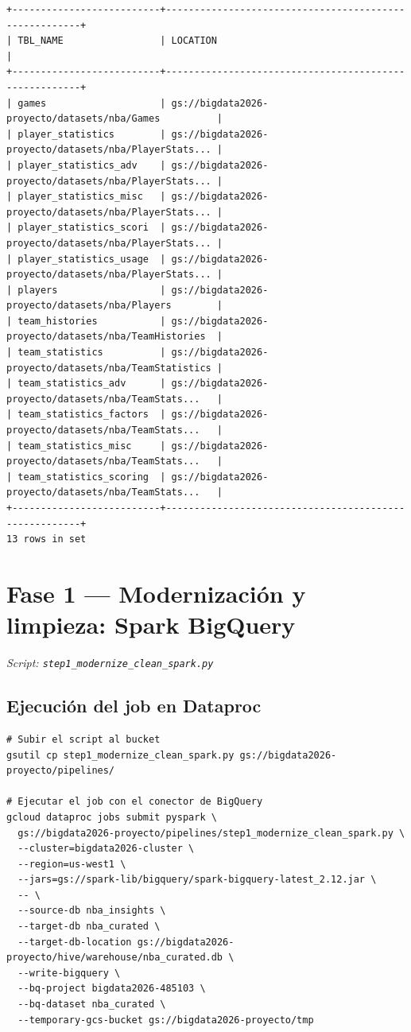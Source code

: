 \documentclass[12pt, letterpaper]{article}
\begin{document}
\begin{lstlisting}[style=outputstyle, caption={Evidencia --- metastore registra las 13 tablas apuntando a GCS}]
+--------------------------+-------------------------------------------------------+
| TBL_NAME                 | LOCATION                                              |
+--------------------------+-------------------------------------------------------+
| games                    | gs://bigdata2026-proyecto/datasets/nba/Games          |
| player_statistics        | gs://bigdata2026-proyecto/datasets/nba/PlayerStats... |
| player_statistics_adv    | gs://bigdata2026-proyecto/datasets/nba/PlayerStats... |
| player_statistics_misc   | gs://bigdata2026-proyecto/datasets/nba/PlayerStats... |
| player_statistics_scori  | gs://bigdata2026-proyecto/datasets/nba/PlayerStats... |
| player_statistics_usage  | gs://bigdata2026-proyecto/datasets/nba/PlayerStats... |
| players                  | gs://bigdata2026-proyecto/datasets/nba/Players        |
| team_histories           | gs://bigdata2026-proyecto/datasets/nba/TeamHistories  |
| team_statistics          | gs://bigdata2026-proyecto/datasets/nba/TeamStatistics |
| team_statistics_adv      | gs://bigdata2026-proyecto/datasets/nba/TeamStats...   |
| team_statistics_factors  | gs://bigdata2026-proyecto/datasets/nba/TeamStats...   |
| team_statistics_misc     | gs://bigdata2026-proyecto/datasets/nba/TeamStats...   |
| team_statistics_scoring  | gs://bigdata2026-proyecto/datasets/nba/TeamStats...   |
+--------------------------+-------------------------------------------------------+
13 rows in set
\end{lstlisting}

\section{Fase 1 — Modernización y limpieza: Spark \textrightarrow{} BigQuery}
\textit{Script: \texttt{step1\_modernize\_clean\_spark.py}}

\subsection{Ejecución del job en Dataproc}

\begin{lstlisting}[style=codestyle, caption={Subida del script y ejecución del job PySpark en Dataproc}]
# Subir el script al bucket
gsutil cp step1_modernize_clean_spark.py gs://bigdata2026-proyecto/pipelines/

# Ejecutar el job con el conector de BigQuery
gcloud dataproc jobs submit pyspark \
  gs://bigdata2026-proyecto/pipelines/step1_modernize_clean_spark.py \
  --cluster=bigdata2026-cluster \
  --region=us-west1 \
  --jars=gs://spark-lib/bigquery/spark-bigquery-latest_2.12.jar \
  -- \
  --source-db nba_insights \
  --target-db nba_curated \
  --target-db-location gs://bigdata2026-proyecto/hive/warehouse/nba_curated.db \
  --write-bigquery \
  --bq-project bigdata2026-485103 \
  --bq-dataset nba_curated \
  --temporary-gcs-bucket gs://bigdata2026-proyecto/tmp
\end{lstlisting}
\end{document}
